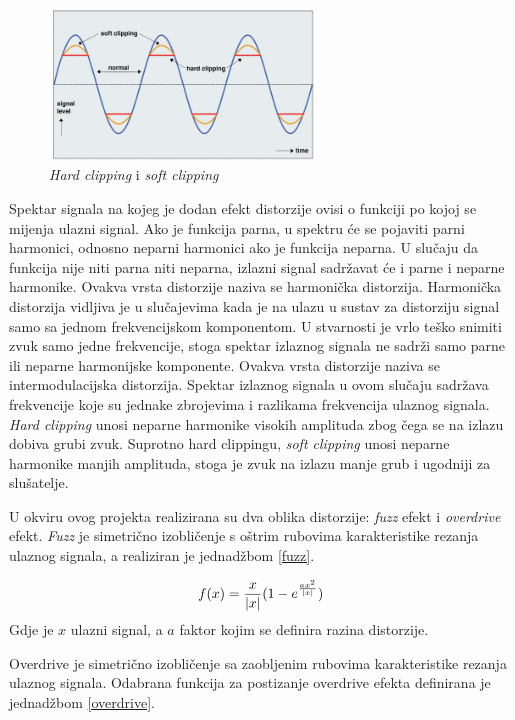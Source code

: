 \documentclass[conference]{IEEEtran}
\begin{document}
\begin{figure}[H]
    \includegraphics[width=200pt]{slike/dist_2.jpg}
    \centering
    \caption{\textit{Hard clipping} i \textit{soft clipping}}
    \label{dist_2}
\end{figure}

Spektar signala na kojeg je dodan efekt distorzije ovisi o funkciji po kojoj se mijenja ulazni signal. Ako je 
funkcija parna, u spektru će se pojaviti parni harmonici, odnosno neparni harmonici ako je funkcija neparna. 
U slučaju da funkcija nije niti parna niti neparna, izlazni signal sadržavat će i parne i neparne harmonike. 
Ovakva vrsta distorzije naziva se harmonička distorzija. Harmonička distorzija vidljiva je u slučajevima kada 
je na ulazu u sustav za distorziju signal samo sa jednom frekvencijskom komponentom. U stvarnosti je vrlo teško 
snimiti zvuk samo jedne frekvencije, stoga spektar izlaznog signala ne sadrži samo parne ili neparne harmonijske 
komponente. Ovakva vrsta distorzije naziva se intermodulacijska distorzija. Spektar izlaznog signala u ovom slučaju 
sadržava frekvencije koje su jednake zbrojevima i razlikama frekvencija ulaznog signala.
\textit{Hard clipping} unosi neparne harmonike visokih amplituda zbog čega se na izlazu dobiva grubi zvuk. 
Suprotno hard clippingu, \textit{soft clipping} unosi neparne harmonike manjih amplituda, stoga je zvuk na izlazu 
manje grub i ugodniji za slušatelje.

U okviru ovog projekta realizirana su dva oblika distorzije: \textit{fuzz} efekt i \textit{overdrive} efekt.
\textit{Fuzz} je simetrično izobličenje s oštrim rubovima karakteristike rezanja ulaznog signala, a realiziran je 
jednadžbom \ref{fuzz}.

\begin{equation}
  f(x)=\frac{x}{|x|}\*(1-e^{\frac{a\*x^2}{|x|}})
  \label{fuzz}
\end{equation}
Gdje je $x$ ulazni signal, a $a$ faktor kojim se definira razina distorzije.

Overdrive je simetrično izobličenje sa zaobljenim rubovima karakteristike rezanja ulaznog signala. Odabrana 
funkcija za postizanje overdrive efekta definirana je jednadžbom \ref{overdrive}.
\end{document}
